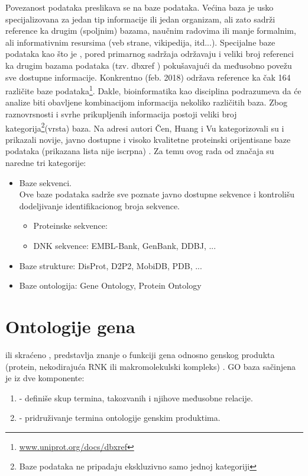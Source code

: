 Povezanost podataka preslikava se na baze podataka. Većina baza je usko specijalizovana
za jedan tip informacije ili jedan organizam, ali zato sadrži reference ka
drugim (spoljnim) bazama, naučnim radovima ili  manje formalnim, ali
informativnim resursima (veb strane, vikipedija, itd...). Specijalne baze podataka kao
što je \uniprotkb, pored primarnog sadržaja održavaju i veliki broj referenci ka
drugim bazama podataka (tzv. dbxref ) pokušavajući
da međusobno povežu sve dostupne informacije. Konkrentno \uniprotkb (feb. 2018)
održava reference ka čak 164 različite baze
podataka\footnote{\url{www.uniprot.org/docs/dbxref}}.  Dakle, bioinformatika
kao disciplina podrazumeva da će analize biti obavljene kombinacijom informacija
nekoliko različitih baza.  Zbog raznovrsnosti i svrhe prikupljenih informacija
postoji veliki broj kategorija\footnote{Baze podataka ne pripadaju ekskluzivno
samo jednoj kategoriji}(vrsta) baza. Na adresi \cite{dbSummary2015} autori Čen, Huang i Vu
kategorizovali su i prikazali novije, javno dostupne i visoko kvalitetne
proteinski orijentisane baze podataka (prikazana lista nije iscrpna) \parencite{Chen2017}.
Za temu ovog rada od značaja su naredne tri kategorije:

\begin{itemize}
  \item Baze sekvenci.\\ 
        Ove baze podataka sadrže sve poznate javno dostupne sekvence i kontrolišu dodeljivanje 
        identifikacionog broja sekvence.
    \begin{itemize}
      \item Proteinske sekvence: \uniprotkb
      \item DNK sekvence: EMBL-Bank, GenBank, DDBJ, ...
    \end{itemize}
  \item Baze strukture: DisProt, D2P2, MobiDB, PDB, ...
  \item Baze ontologija: Gene Ontology, Protein Ontology
\end{itemize}


\section{Ontologije gena}
\label{GO}

  ili skraćeno , 
predstavlja znanje o funkciji gena odnosno genskog
produkta (protein, nekodirajuća RNK ili makromolekulski kompleks)
\parencite{GO2016}.
GO baza sačinjena je iz dve komponente:
\begin{enumerate}
  \item {} - definiše skup termina, takozvanih
      i njihove međusobne relacije.
  \item {} - pridruživanje termina ontologije genskim produktima.
\end{enumerate}

